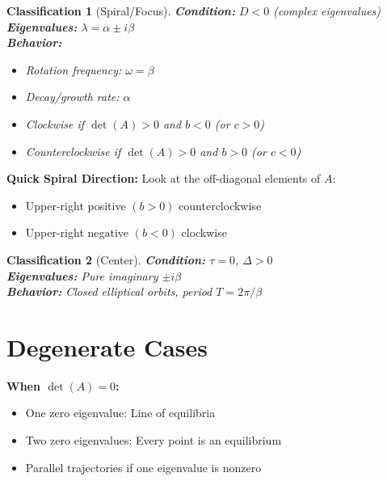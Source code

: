 \documentclass[12pt]{article}
\newtheorem{classification}{Classification}
\begin{document}
\begin{classification}[Spiral/Focus]
\textbf{Condition:} $D < 0$ (complex eigenvalues)\\
\textbf{Eigenvalues:} $\lambda = \alpha \pm i\beta$\\
\textbf{Behavior:}
\begin{itemize}
    \item Rotation frequency: $\omega = \beta$
    \item Decay/growth rate: $\alpha$
    \item Clockwise if $\det(A) > 0$ and $b < 0$ (or $c > 0$)
    \item Counterclockwise if $\det(A) > 0$ and $b > 0$ (or $c < 0$)
\end{itemize}
\end{classification}

\begin{insight}
\textbf{Quick Spiral Direction:}
Look at the off-diagonal elements of $A$:
\begin{itemize}
    \item Upper-right positive $(b > 0)$ \rightarrow counterclockwise
    \item Upper-right negative $(b < 0)$ \rightarrow clockwise
\end{itemize}
\end{insight}

\begin{classification}[Center]
\textbf{Condition:} $\tau = 0$, $\Delta > 0$\\
\textbf{Eigenvalues:} Pure imaginary $\pm i\beta$\\
\textbf{Behavior:} Closed elliptical orbits, period $T = 2\pi/\beta$
\end{classification}

\section{Degenerate Cases}

\begin{warning}
\textbf{When $\det(A) = 0$:}
\begin{itemize}
    \item One zero eigenvalue: Line of equilibria
    \item Two zero eigenvalues: Every point is an equilibrium
    \item Parallel trajectories if one eigenvalue is nonzero
\end{itemize}
\end{warning}
\end{document}
